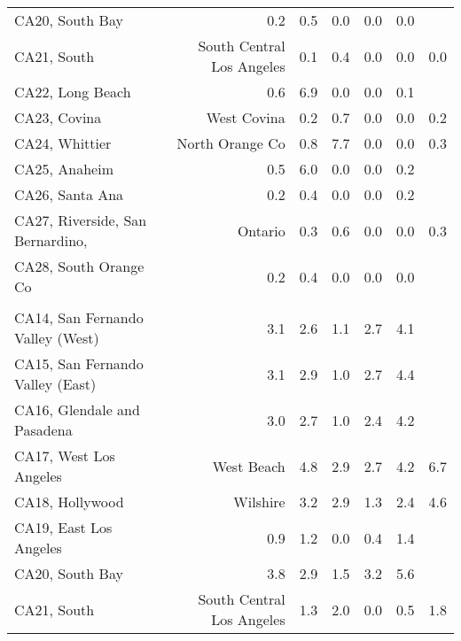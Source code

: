 \begin{longtable}[l]{l|rrrrr}
\hspace{1em}CA20, South Bay & 0.2 & 0.5 & 0.0 & 0.0 & 0.0\\
\hspace{1em}CA21, South & South Central Los Angeles & 0.1 & 0.4 & 0.0 & 0.0 & 0.0\\
\hspace{1em}CA22, Long Beach & 0.6 & 6.9 & 0.0 & 0.0 & 0.1\\
\hspace{1em}CA23, Covina & West Covina & 0.2 & 0.7 & 0.0 & 0.0 & 0.2\\
\hspace{1em}CA24, Whittier & North Orange Co & 0.8 & 7.7 & 0.0 & 0.0 & 0.3\\
\hspace{1em}CA25, Anaheim & 0.5 & 6.0 & 0.0 & 0.0 & 0.2\\
\hspace{1em}CA26, Santa Ana & 0.2 & 0.4 & 0.0 & 0.0 & 0.2\\
\hspace{1em}CA27, Riverside, San Bernardino, & Ontario & 0.3 & 0.6 & 0.0 & 0.0 & 0.3\\
\hspace{1em}CA28, South Orange Co & 0.2 & 0.4 & 0.0 & 0.0 & 0.0\\
\addlinespace[0.5em]
\\
\hspace{1em}CA14, San Fernando Valley (West) & 3.1 & 2.6 & 1.1 & 2.7 & 4.1\\
\hspace{1em}CA15, San Fernando Valley (East) & 3.1 & 2.9 & 1.0 & 2.7 & 4.4\\
\hspace{1em}CA16, Glendale and Pasadena & 3.0 & 2.7 & 1.0 & 2.4 & 4.2\\
\hspace{1em}CA17, West Los Angeles & West Beach & 4.8 & 2.9 & 2.7 & 4.2 & 6.7\\
\hspace{1em}CA18, Hollywood & Wilshire & 3.2 & 2.9 & 1.3 & 2.4 & 4.6\\
\hspace{1em}CA19, East Los Angeles & 0.9 & 1.2 & 0.0 & 0.4 & 1.4\\
\hspace{1em}CA20, South Bay & 3.8 & 2.9 & 1.5 & 3.2 & 5.6\\
\hspace{1em}CA21, South & South Central Los Angeles & 1.3 & 2.0 & 0.0 & 0.5 & 1.8\\

\end{longtable}
